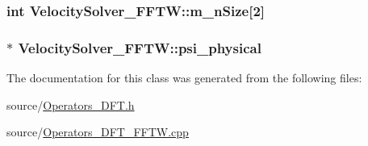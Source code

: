 \subsubsection[{m\+\_\+n\+Size}]{\setlength{\rightskip}{0pt plus 5cm}int Velocity\+Solver\+\_\+\+F\+F\+T\+W\+::m\+\_\+n\+Size\mbox{[}2\mbox{]}\hspace{0.3cm}{\ttfamily [protected]}}\label{class_velocity_solver___f_f_t_w_aacf92cd1fa310188280e3c7f6352bede}
\hypertarget{class_velocity_solver___f_f_t_w_ac0176cfda775251bb353dc0fdd3a21a4}{}
\subsubsection[{psi\+\_\+physical}]{$\ast$ Velocity\+Solver\+\_\+\+F\+F\+T\+W\+::psi\+\_\+physical\hspace{0.3cm}{\ttfamily [protected]}}\label{class_velocity_solver___f_f_t_w_ac0176cfda775251bb353dc0fdd3a21a4}


The documentation for this class was generated from the following files\+:\begin{DoxyCompactItemize}
\item 
source/\hyperlink{_operators___d_f_t_8h}{Operators\+\_\+\+D\+F\+T.\+h}\item 
source/\hyperlink{_operators___d_f_t___f_f_t_w_8cpp}{Operators\+\_\+\+D\+F\+T\+\_\+\+F\+F\+T\+W.\+cpp}\end{DoxyCompactItemize}
